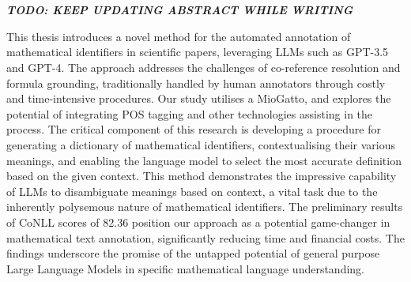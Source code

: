 \chapter{\abstractname}

\textbf{\textit{TODO: KEEP UPDATING ABSTRACT WHILE WRITING}}


This thesis introduces a novel method for the automated annotation of mathematical identifiers in scientific papers, leveraging \ac{LLMs} such as GPT-3.5 and GPT-4. The approach addresses the challenges of co-reference resolution and formula grounding, traditionally handled by human annotators through costly and time-intensive procedures. Our study utilises a \ac{MioGatto}, and explores the potential of integrating \ac{POS} tagging and other technologies assisting in the process.
The critical component of this research is developing a procedure for generating a dictionary of mathematical identifiers, contextualising their various meanings, and enabling the language model to select the most accurate definition based on the given context. This method demonstrates the impressive capability of LLMs to disambiguate meanings based on context, a vital task due to the inherently polysemous nature of mathematical identifiers.
The preliminary results of \ac{CoNLL} scores of 82.36 position our approach as a potential game-changer in mathematical text annotation, significantly reducing time and financial costs.
The findings underscore the promise of the untapped potential of general purpose Large Language Models in specific mathematical language understanding.


